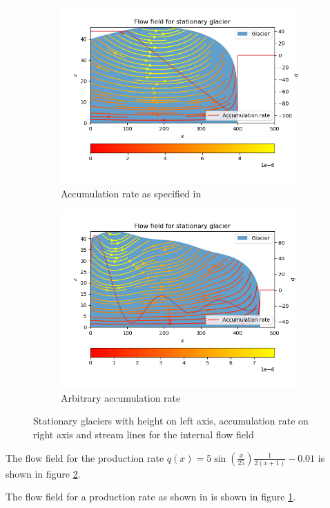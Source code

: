 \begin{figure}
    \centering
    \begin{subfigure}[b]{0.4\textwidth}
        \includegraphics[width=\textwidth]{report/images/flow_field_linear_production.png}
        \caption{Accumulation rate as specified in }
        \label{fig:linear}
    \end{subfigure}
    \begin{subfigure}[b]{0.4\textwidth}
        \includegraphics[width=\textwidth]{report/images/flow_field_arbitrary_production.png}
        \caption{Arbitrary accumulation rate}
        \label{fig:arbitrary}
    \end{subfigure}
    \caption{Stationary glaciers with height on left axis, accumulation rate on right axis and stream lines for the internal flow field}\label{fig:animals}
\end{figure}

The flow field for the production rate $q(x) = 5\sin(\frac{x}{25})\frac{1}{2(x + 1)} - 0.01$ is shown in figure \ref{fig:arbitrary}.

The flow field for a production rate as shown in  is shown in figure \ref{fig:linear}.